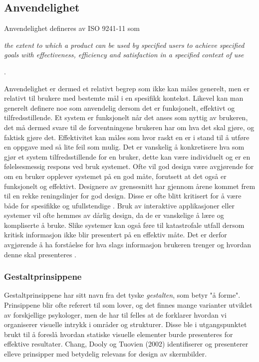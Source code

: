 \subsection{Anvendelighet}
\label{chp: anvendelighet}

Anvendelighet defineres av ISO 9241-11 som

\noindent
\begin{otherlanguage}{english}
\emph{the extent to which a product can be used by specified users to achieve specified goals with effectiveness, efficiency and satisfaction in a specified context of use}
\end{otherlanguage}
 \cite{Svanes08}.

\noindent
Anvendelighet er dermed et relativt begrep som ikke kan måles generelt, men er relativt til brukere med bestemte mål i en spesifikk kontekst. Likevel kan man generelt definere noe som anvendelig dersom det er funksjonelt, effektivt og tilfredsstillende.
Et system er funksjonelt når det anses som nyttig av brukeren, det må dermed svare til de forventningene brukeren har om hva det skal gjøre, og faktisk gjøre det. Effektivitet kan måles som hvor raskt en er i stand til å utføre en oppgave med så lite feil som mulig. Det er vanskelig å konkretisere hva som gjør et system tilfredsstillende for en bruker, dette kan være individuelt og er en følelsesmessig respons ved bruk systemet. Ofte vil god design være avgjørende for om en bruker opplever systemet på en god måte, forutsett at det også er funksjonelt og effektivt. Designere av grensesnitt har gjennom årene kommet frem til en rekke reningslinjer for god design. Disse er ofte blitt kritisert for å være både for spesifikke og ufullstendige \cite{mmi}. 
Bruk av interaktive applikasjoner eller systemer vil ofte hemmes av dårlig design, da de er vanskelige å lære og kompliserte å bruke. Slike systemer kan også føre til katastrofale utfall dersom kritisk informasjon ikke blir presentert på en effektiv måte. Det er derfor avgjørende å ha forståelse for hva slags informasjon brukeren trenger og hvordan denne skal presenteres \cite{Ebright10}. 

\noindent
\subsubsection{Gestaltprinsippene}
Gestaltprinsippene har sitt navn fra det tyske \emph{gestalten}, som betyr "å forme". Prinsippene blir ofte referert til som lover, og det finnes mange varianter utviklet av forskjellige psykologer, men de har til felles at de forklarer hvordan vi organiserer visuelle intrykk i områder og strukturer. Disse ble i utgangspunktet brukt til å foreslå hvordan statiske visuelle elementer burde presenteres for effektive resultater\cite{Chang02}. Chang, Dooly og Tuovien (2002) identifiserer og presenterer elleve prinsipper med betydelig relevans for design av skermbilder. 

